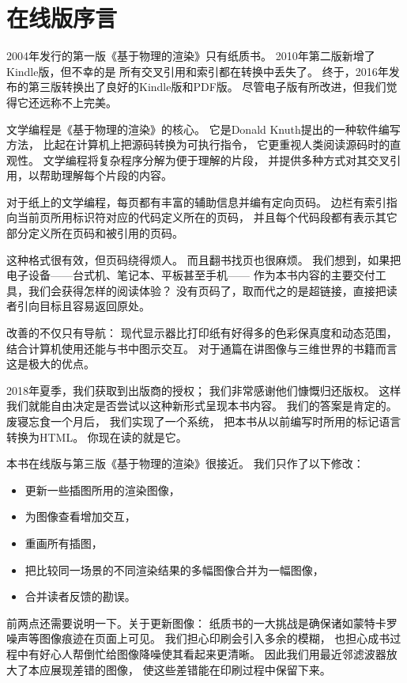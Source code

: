 \chapter{在线版序言}\label{chap:在线版序言}

2004年发行的第一版《基于物理的渲染》只有纸质书。
2010年第二版新增了Kindle版，但不幸的是
所有交叉引用和索引都在转换中丢失了。
终于，2016年发布的第三版转换出了良好的Kindle版和PDF版。
尽管电子版有所改进，但我们觉得它还远称不上完美。

文学编程是《基于物理的渲染》的核心。
它是Donald Knuth提出的一种软件编写方法，
比起在计算机上把源码转换为可执行指令，
它更重视人类阅读源码时的直观性。
文学编程将复杂程序分解为便于理解的片段，
并提供多种方式对其交叉引用，以帮助理解每个片段的内容。

对于纸上的文学编程，每页都有丰富的辅助信息并编有定向页码。
边栏有索引指向当前页所用标识符对应的代码定义所在的页码，
并且每个代码段都有表示其它部分定义所在页码和被引用的页码。

这种格式很有效，但页码绕得烦人。
而且翻书找页也很麻烦。
我们想到，如果把电子设备——台式机、笔记本、平板甚至手机——
作为本书内容的主要交付工具，我们会获得怎样的阅读体验？
没有页码了，取而代之的是超链接，直接把读者引向目标且容易返回原处。

改善的不仅只有导航：
现代显示器比打印纸有好得多的色彩保真度和动态范围，
结合计算机使用还能与书中图示交互。
对于通篇在讲图像与三维世界的书籍而言这是极大的优点。

2018年夏季，我们获取到出版商的授权；
我们非常感谢他们慷慨归还版权。
这样我们就能自由决定是否尝试以这种新形式呈现本书内容。
我们的答案是肯定的。
废寝忘食一个月后，
我们实现了一个系统，
把本书从以前编写时所用的标记语言转换为HTML。
你现在读的就是它。

本书在线版与第三版《基于物理的渲染》很接近。
我们只作了以下修改：
\begin{itemize}
    \item 更新一些插图所用的渲染图像，
    \item 为图像查看增加交互，
    \item 重画所有插图，
    \item 把比较同一场景的不同渲染结果的多幅图像合并为一幅图像，
    \item 合并读者反馈的勘误。
\end{itemize}

前两点还需要说明一下。关于更新图像：
纸质书的一大挑战是确保诸如蒙特卡罗噪声等图像痕迹在页面上可见。
我们担心印刷会引入多余的模糊，
也担心成书过程中有好心人帮倒忙给图像降噪使其看起来更清晰。
因此我们用最近邻滤波器放大了本应展现差错的图像，
使这些差错能在印刷过程中保留下来。

